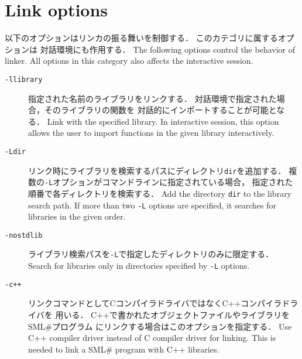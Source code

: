 \documentclass{jbook}
\newcommand{\txt}[2]{#2}
\newcommand{\smlsharp}{SML\#}
\newcommand{\term}[1]{\mbox{{\tt #1}}}
\begin{document}
\section{\txt{リンクオプション}{Link options}}

\ifjp%
	以下のオプションはリンカの振る舞いを制御する．
	このカテゴリに属するオプションは
対話環境にも作用する．
\else%
	The following options control the behavior of linker.
	All options in this category also affects the interactive session.
\fi%

\begin{description}
\item[{\tt -l\term{library}}]
\ifjp%
	指定された名前のライブラリをリンクする．
	対話環境で指定された場合，そのライブラリの関数を
対話的にインポートすることが可能となる．
\else%
	Link with the specified library.
	In interactive session,
this option allows the user to import functions in the given library
interactively.
\fi%

\item[{\tt-L\term{dir}}]
\ifjp%
	リンク時にライブラリを検索するパスにディレクトリ\term{dir}を追加する．
	複数の{\tt -L}オプションがコマンドラインに指定されている場合，
指定された順番で各ディレクトリを検索する．
\else%
	Add the directory \term{dir} to the library search path.
	If more than two {\tt -L} options are specified,
it searches for libraries in the given order.
\fi%

\item[{\tt -nostdlib}]
\ifjp%
	ライブラリ検索パスを{\tt -L}で指定したディレクトリのみに限定する．
\else%
	Search for libraries only in directories specified by
{\tt -L} options.
\fi%

\item[{\tt -c++}]
\ifjp%
	リンクコマンドとしてCコンパイラドライバではなくC++コンパイラドライバを
用いる．
        C++で書かれたオブジェクトファイルやライブラリを\smlsharp{}プログラム
にリンクする場合はこのオプションを指定する．
\else%
	Use C++ compiler driver instead of C compiler driver for linking.
	This is needed to link a \smlsharp{} program with C++ libraries.
\fi%


\end{description}
\end{document}
